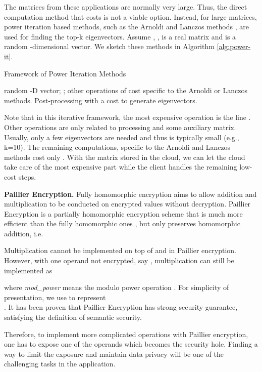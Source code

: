 \documentclass[10pt, conference, compsocconf]{IEEEtran}
\begin{document}
The matrices from these applications are normally very large. Thus, the direct computation method that costs  is not a viable option. Instead, for large matrices, power iteration based methods, such as the Arnoldi \cite{arnoldi51} and Lanczos methods \cite{cullum85}, are used for finding the top-k eigenvectors. 
Assume , , is a  real matrix and  is a random -dimensional vector. We sketch these methods in Algorithm \ref{alg:power-it}.
\begin{algorithm}[htb]
\caption{Framework of Power Iteration Methods}\label{alg:power-it}
\begin{algorithmic}[1]
\STATE  random -D vector;  
\STATE ;
\STATE other operations of cost  specific to the Arnoldi or Lanczos methods.  
\ENDFOR
\STATE Post-processing with a cost  to generate eigenvectors. 
\end{algorithmic}
\end{algorithm}

Note that in this iterative framework, the most expensive operation is the line . Other operations are only related to processing  and some auxiliary  matrix. Usually, only a few eigenvectors are needed and thus  is typically small (e.g., k=10). The remaining computations, specific to the Arnoldi and Lanczos methods cost only . With the matrix stored in the cloud, we can let the cloud take care of the most expensive part while the client handles the remaining low-cost steps. 


\textbf{Paillier Encryption.} 
Fully homomorphic encryption aims to allow addition and multiplication to be conducted on encrypted values without decryption. Paillier Encryption is a partially homomorphic encryption scheme that is much more efficient than the fully homomorphic ones \cite{gentry09}, but only preserves homomorphic addition, i.e. 

Multiplication cannot be implemented on top of  and  in Paillier encryption. However, with one operand not encrypted, say , multiplication can still be implemented as

where \emph{mod\_power} means the modulo power operation \cite{katz07}. For simplicity of presentation, we use  to represent \\. It has been proven that Paillier Encryption has strong security guarantee, satisfying the definition of semantic security.

Therefore, to implement more complicated operations with Paillier encryption, one has to expose one of the operands which becomes the security hole. Finding a way to limit the exposure and maintain data privacy will be one of the challenging tasks in the application. 
\end{document}
